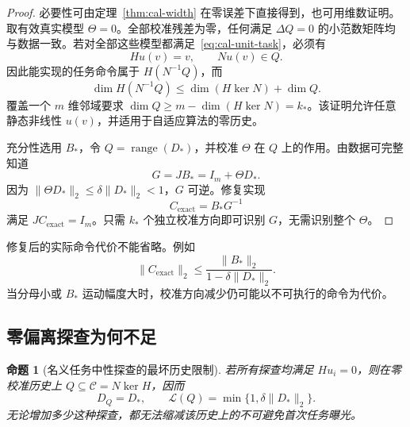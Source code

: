 \documentclass[11pt,a4paper]{article}
\numberwithin{equation}{section}
\newtheorem{proposition}[theorem]{命题}
\theoremstyle{definition}
\begin{document}
\begin{proof}
必要性可由定理~\ref{thm:cal-width} 在零误差下直接得到，也可用维数证明。取有效真实模型 $\Theta=0$。全部校准残差为零，任何满足 $\Delta Q=0$ 的小范数矩阵均与数据一致。若对全部这些模型都满足~\eqref{eq:cal-unit-task}，必须有
\begin{equation}
  Hu(v)=v,\qquad Nu(v)\in Q .
\end{equation}
因此能实现的任务命令属于 $H(N^{-1}Q)$，而
\begin{equation}
  \dim H(N^{-1}Q)
  \le\dim(H\ker N)+\dim Q .
\end{equation}
覆盖一个 $m$ 维邻域要求 $\dim Q\ge m-\dim(H\ker N)=k_*$。该证明允许任意静态非线性 $u(v)$，并适用于自适应算法的零历史。

充分性选用 $B_*$，令 $Q=\operatorname{range}(D_*)$，并校准 $\Theta$ 在 $Q$ 上的作用。由数据可完整知道
\begin{equation}
  G=JB_*=I_m+\Theta D_* .
\end{equation}
因为 $\|\Theta D_*\|_2\le\delta\|D_*\|_2<1$，$G$ 可逆。修复实现
\begin{equation}
  C_{\mathrm{exact}}=B_*G^{-1}
  \label{eq:cal-exact-repair}
\end{equation}
满足 $JC_{\mathrm{exact}}=I_m$。只需 $k_*$ 个独立校准方向即可识别 $G$，无需识别整个 $\Theta$。
\end{proof}

修复后的实际命令代价不能省略。例如
\begin{equation}
  \|C_{\mathrm{exact}}\|_2
  \le
  \frac{\|B_*\|_2}{1-\delta\|D_*\|_2}.
  \label{eq:cal-exact-command-bound}
\end{equation}
当分母小或 $B_*$ 运动幅度大时，校准方向减少仍可能以不可执行的命令为代价。

\subsection{零偏离探查为何不足}

\begin{proposition}[名义任务中性探查的最坏历史限制]
\label{prop:cal-neutral}
若所有探查均满足 $Hu_i=0$，则在零校准历史上 $Q\subseteq\mathcal C=N\ker H$，因而
\begin{equation}
  D_Q=D_*,
  \qquad
  \mathcal L(Q)=\min\{1,\delta\|D_*\|_2\}.
  \label{eq:cal-neutral-no-width}
\end{equation}
无论增加多少这种探查，都无法缩减该历史上的不可避免首次任务曝光。
\end{proposition}
\end{document}
